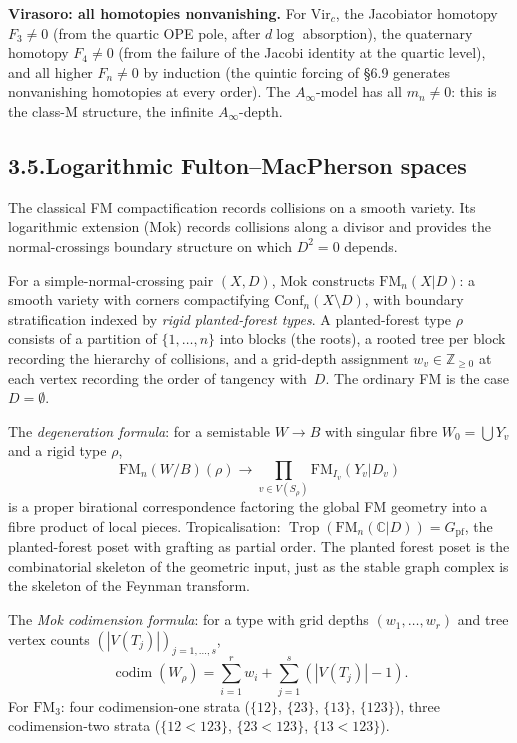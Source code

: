 \documentclass[11pt,reqno]{amsart}
\theoremstyle{definition}
\theoremstyle{remark}
\providecommand{\Vir}{\mathrm{Vir}}
\numberwithin{equation}{section}
\begin{document}
\medskip
\noindent\textbf{Virasoro: all homotopies nonvanishing.}\enspace
For $\Vir_c$, the Jacobiator homotopy $F_3\neq 0$
(from the quartic OPE pole, after $d\log$ absorption), the
quaternary homotopy $F_4\neq 0$ (from the failure of the Jacobi
identity at the quartic level), and all higher $F_n\neq 0$ by
induction (the quintic forcing of \S6.9 generates nonvanishing
homotopies at every order). The $A_\infty$-model has all $m_n\neq 0$:
this is the class-M structure, the infinite $A_\infty$-depth.

\subsection*{3.5.\enspace Logarithmic Fulton--MacPherson spaces}

The classical FM compactification records collisions on a smooth
variety. Its logarithmic extension (Mok) records collisions along a
divisor and provides the normal-crossings boundary structure on which
$D^2=0$ depends.

For a simple-normal-crossing pair $(X,D)$, Mok constructs
$\mathrm{FM}_n(X|D)$: a smooth variety with corners compactifying
$\mathrm{Conf}_n(X\setminus D)$, with boundary stratification indexed
by \emph{rigid planted-forest types}. A planted-forest type $\rho$
consists of a partition of $\{1,\ldots,n\}$ into blocks (the roots),
a rooted tree per block recording the hierarchy of collisions, and a
grid-depth assignment $w_v\in\mathbb Z_{\ge 0}$ at each vertex
recording the order of tangency with~$D$. The ordinary FM is the
case $D=\emptyset$.

The \emph{degeneration formula}: for a semistable $W\to B$ with
singular fibre $W_0=\bigcup Y_v$ and a rigid type $\rho$,
\[
\mathrm{FM}_n(W/B)(\rho)\longrightarrow\prod_{v\in V(S_\rho)}\mathrm{FM}_{I_v}(Y_v|D_v)
\]
is a proper birational correspondence factoring the global FM
geometry into a fibre product of local pieces. Tropicalisation:
$\operatorname{Trop}(\mathrm{FM}_n(\mathbb C|D))=G_{\mathrm{pf}}$, the
planted-forest poset with grafting as partial order. The planted
forest poset is the combinatorial skeleton of the geometric input,
just as the stable graph complex is the skeleton of the Feynman
transform.

The \emph{Mok codimension formula}: for a type with grid depths
$(w_1,\ldots,w_r)$ and tree vertex counts $(|V(T_j)|)_{j=1,\ldots,s}$,
\[
\operatorname{codim}(W_\rho)=\sum_{i=1}^r w_i+\sum_{j=1}^s(|V(T_j)|-1).
\]
For $\mathrm{FM}_3$: four codimension-one strata ($\{12\}$, $\{23\}$,
$\{13\}$, $\{123\}$), three codimension-two strata
($\{12{<}123\}$, $\{23{<}123\}$, $\{13{<}123\}$).
\end{document}
